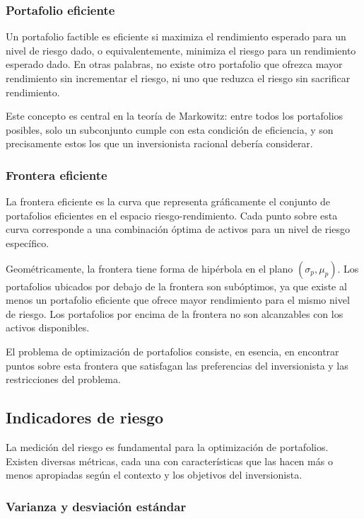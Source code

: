 \documentclass[12pt]{article}
\begin{document}
\subsubsection{Portafolio eficiente}
Un portafolio factible es eficiente si maximiza el rendimiento
esperado para un nivel de riesgo dado, o equivalentemente, minimiza
el riesgo para un rendimiento esperado dado. En otras palabras, no
existe otro portafolio que ofrezca mayor rendimiento sin incrementar
el riesgo, ni uno que reduzca el riesgo sin sacrificar rendimiento.

Este concepto es central en la teoría de Markowitz: entre todos los
portafolios posibles, solo un subconjunto cumple con esta condición
de eficiencia, y son precisamente estos los que un inversionista
racional debería considerar.

\subsubsection{Frontera eficiente}
La frontera eficiente es la curva que representa gráficamente el
conjunto de portafolios eficientes en el espacio riesgo-rendimiento.
Cada punto sobre esta curva corresponde a una combinación óptima de
activos para un nivel de riesgo específico.

Geométricamente, la frontera tiene forma de hipérbola en el plano
$(\sigma_p, \mu_p)$. Los portafolios ubicados por debajo de la
frontera son subóptimos, ya que existe al menos un portafolio
eficiente que ofrece mayor rendimiento para el mismo nivel de riesgo.
Los portafolios por encima de la frontera no son alcanzables con los
activos disponibles.

El problema de optimización de portafolios consiste, en esencia, en
encontrar puntos sobre esta frontera que satisfagan las preferencias
del inversionista y las restricciones del problema.

\subsection{Indicadores de riesgo}

La medición del riesgo es fundamental para la optimización de
portafolios. Existen diversas métricas, cada una con características
que las hacen más o menos apropiadas según el contexto y los
objetivos del inversionista.

\subsubsection{Varianza y desviación estándar}
\end{document}
